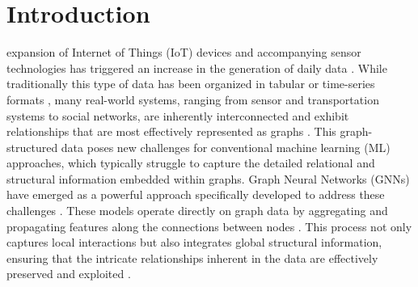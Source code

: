 \documentclass[journal]{IEEEtran}
\begin{document}
\section{Introduction} \label{sec:introduccion}
% 
% 
% 
% 
 expansion of Internet of Things (IoT) devices and accompanying sensor technologies has triggered an increase in the generation of daily data \cite{lo2022graphsage}. While traditionally this type of data has been organized in tabular or time-series formats \cite{Lakshmanna2022Review}, many real-world systems, ranging from sensor and transportation systems to social networks, are inherently interconnected and exhibit relationships that are most effectively represented as graphs \cite{li2024survey}. This graph-structured data poses new challenges for conventional machine learning (ML) approaches, which typically struggle to capture the detailed relational and structural information embedded within graphs. Graph Neural Networks (GNNs) \cite{kipf2016semi} have emerged as a powerful approach specifically developed to address these challenges \cite{wu2020comprehensive}. These models operate directly on graph data by aggregating and propagating features along the connections between nodes \cite{Zhou2020Review}. This process not only captures local interactions but also integrates global structural information, ensuring that the intricate relationships inherent in the data are effectively preserved and exploited \cite{Zheng2023TemporalGNN}.
\end{document}
